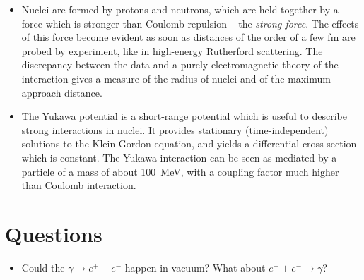 \begin{itemize}
    \item Nuclei are formed by protons and neutrons, which are held together by a force which is stronger than Coulomb repulsion -- the \emph{strong force}. The effects of this force become evident as soon as distances of the order of a few \si{fm} are probed by experiment, like in high-energy Rutherford scattering. The discrepancy between the data and a purely electromagnetic theory of the interaction gives a measure of the radius of nuclei and of the maximum approach distance. 
    \item The Yukawa potential is a short-range potential which is useful to describe strong interactions in nuclei. It provides stationary (time-independent) solutions to the Klein-Gordon equation, and yields a differential cross-section which is constant. The Yukawa interaction can be seen as mediated by a particle of a mass of about \SI{100}{MeV}, with a coupling factor much higher than Coulomb interaction.
\end{itemize}
\section*{Questions}
\begin{itemize}
    \item Could the $\gamma\to e^++e^-$ happen in vacuum? What about $e^++e^-\to \gamma$?
\end{itemize}